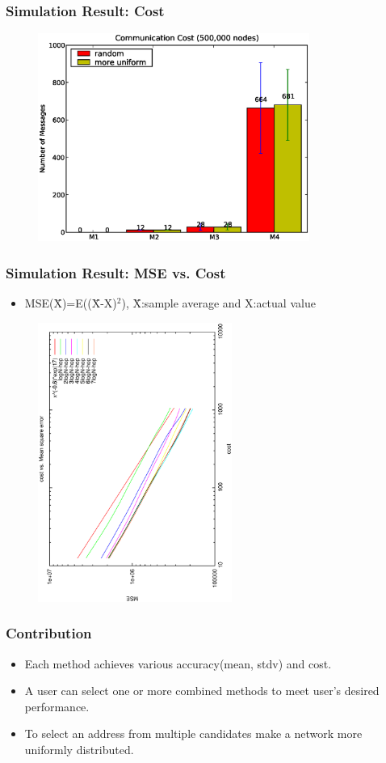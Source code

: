 \documentclass[red]{beamer}
\begin{document}
\begin{frame}
\frametitle{Simulation Result: Cost}
\begin{figure}
\centering
\includegraphics[width=3.5in]{figs/cost500k}
\end{figure}
\end{frame}
\begin{frame}
\frametitle{Simulation Result: MSE vs. Cost}
\begin{itemize}
\item MSE(\=X)=E((\=X-X)$^{2}$), \=X:sample average and X:actual value  
\end{itemize}
\begin{figure}
\centering
\includegraphics[width=2.5in,angle=270]{figs/cost_mse1}
\end{figure}
\end{frame}
\begin{frame}
\frametitle{Contribution}
\begin{itemize}
\item Each method achieves various accuracy(mean, stdv) and cost.
\item A user can select one or more combined methods to meet user's desired performance.
\item To select an address from multiple candidates make a network more uniformly distributed.
\end{itemize}
\end{frame}
\end{document}
